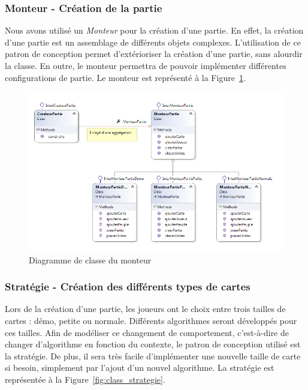 \documentclass[a4paper]{article}%
\begin{document}
\subsubsection{Monteur - Création de la partie}

Nous avons utilisé un \textit{Monteur} pour la création d'une partie. En effet, la création d'une partie est un assemblage de différents objets complexes. L'utilisation de ce patron de conception permet d'extérioriser la création d'une partie, sans alourdir la classe.
En outre, le monteur permettra de pouvoir implémenter différentes configurations de partie. Le monteur est représenté à la Figure~\ref{fig:class_monteur}.

\begin{figure}[H]
    \centering
    \includegraphics[width=\textwidth]{./images/classe/monteur.png}
		\caption{Diagramme de classe du monteur}
		\label{fig:class_monteur}
\end{figure}


\subsubsection{Stratégie - Création des différents types de cartes}

Lors de la création d'une partie, les joueurs ont le choix entre trois tailles de cartes : démo, petite ou normale. Différents algorithmes seront développés pour ces tailles. Afin de modéliser ce changement de comportement, c'est-à-dire de changer d'algorithme en fonction du contexte, le patron de conception utilisé est la stratégie. De plus, il sera très facile d'implémenter une nouvelle taille de carte si besoin, simplement par l'ajout d'un nouvel algorithme. La stratégie est représentée à la Figure~\ref{fig:class_strategie}.
\end{document}
